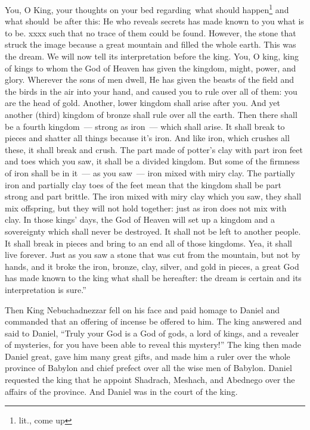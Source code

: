 \begin{inparaenum}
     You, O King, your thoughts on your bed regarding\understood\ what should happen\footnote{lit., come up} and what should\understood\ be after this: He who reveals secrets has made known to you what is to be.%
     xxxx such that no trace of them could be found. However, the stone that struck the image because a great mountain and filled the whole earth.%
     This was the dream. We will now tell its interpretation before the king.%
     You, O king, king of kings to whom the God of Heaven has given the kingdom, might, power, and glory.%
     Wherever the sons of men dwell, He has given the beasts of the field and the birds in the air into your hand, and caused you to rule over all of them: you are the head of gold.%
     Another, lower kingdom shall arise after you. And yet another (third) kingdom of bronze shall rule over all the earth.%
     Then there shall be a fourth kingdom~--- strong as iron~--- which shall arise. It shall break to pieces and shatter all things because it's iron. And like iron, which crushes all these, it shall break and crush.%
     The part made of potter's clay with part iron feet and toes which you saw, it shall be a divided kingdom. But some of the firmness of iron shall be in it~--- as you saw~--- iron mixed with miry clay.%
     The partially iron and partially clay toes of the feet mean that the kingdom shall be part strong and part brittle.%
     The iron mixed with miry clay which you saw, they shall mix offspring, but they will not hold together: just as iron does not mix with clay.%
     In those kings' days, the God of Heaven will set up a kingdom and a sovereignty which shall never be destroyed. It shall not be left to another people. It shall break in pieces and bring to an end all of those kingdoms. Yea, it shall live forever.%
     Just as you saw a stone that was cut from the mountain, but not by hands, and it broke the iron, bronze, clay, silver, and gold in pieces, a great God has made known to the king what shall be hereafter: the dream is certain and its interpretation is sure.''%
    
     Then King Nebuchadnezzar fell on his face and paid homage to Daniel and commanded that an offering of incense be offered to him.%
     The king answered and said to Daniel, ``Truly your God is a God of gods, a lord of kings, and a revealer of mysteries, for you have been able to reveal this mystery!''%
     The king then made Daniel great, gave him many great gifts, and made him a ruler over the whole province of Babylon and chief prefect over all the wise men of Babylon.%
     Daniel requested the king that he appoint Shadrach, Meshach, and Abednego over the affairs of the province. And Daniel was in the court of the king.%
\end{inparaenum}
